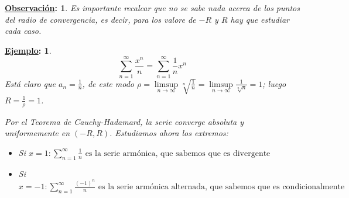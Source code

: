 \documentclass[10pt,a4paper,openright]{book}
\theoremstyle{break}
\newtheorem*{obs}{\underline{Observación}:}
\newtheorem*{ej}{\underline{Ejemplo}:}
\begin{document}
\begin{obs}
Es importante recalcar que no se sabe nada acerca de los puntos del radio de convergencia, es decir, para los valore de $-R$ y $R$ hay que estudiar cada caso.
\end{obs}

\begin{ej}
$$\sum_{n=1}^{\infty} \frac{x^n}{n} = \sum_{n=1}^{\infty} \frac{1}{n} x^n$$
Está claro que $a_n = \frac{1}{n}$, de este modo $\rho =  \underset{n \to \infty}\limsup \sqrt[n]{\frac{1}{n}} = \underset{n \to \infty}\limsup \frac{1}{\sqrt[n]{n}} = 1 $; luego $R = \frac{1}{\rho} = 1$.

Por el Teorema de Cauchy-Hadamard, la serie converge absoluta y uniformemente en $(-R, R)$. Estudiamos ahora los extremos:
\begin{itemize}
\item Si $x = 1 : \sum_{n=1}^{\infty} \frac{1}{n} \mbox{ es la serie armónica, que sabemos que es divergente }$

\item Si $x = -1: \sum_{n=1}^{\infty} \frac{(-1)^n}{n} \mbox{ es la serie armónica alternada, que sabemos que es condicionalmente convergente }$
\end{itemize}
\end{ej}
\end{document}
